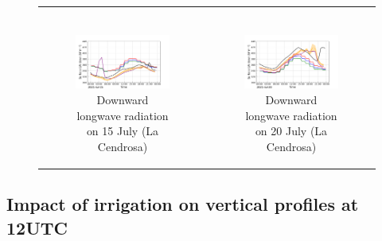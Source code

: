 \begin{figure}[hbtp]
\begin{tabular}{cc}
\begin{subfigure}[t]{0.5\textwidth}
        \end{subfigure} \\
        \begin{subfigure}[t]{0.5\textwidth}
            \caption{Downward longwave radiation on 15 July (La Cendrosa)}
            \includegraphics[width=\textwidth]{images/chap5/IOP_TS/TS_2021-07-15_cendrosa_LWdnSFC.png}
        \end{subfigure} &
        \begin{subfigure}[t]{0.5\textwidth}
            \caption{Downward longwave radiation on 20 July (La Cendrosa)}
            \includegraphics[width=\textwidth]{images/chap5/IOP_TS/TS_2021-07-20_cendrosa_LWdnSFC.png}
        \end{subfigure}
    \end{tabular}
    \caption{}
    \label{fig:iop_days_TS_energy}
\end{figure}

\clearpage

\subsection{Impact of irrigation on vertical profiles at 12UTC}
\label{sec:vertical_profiles}

